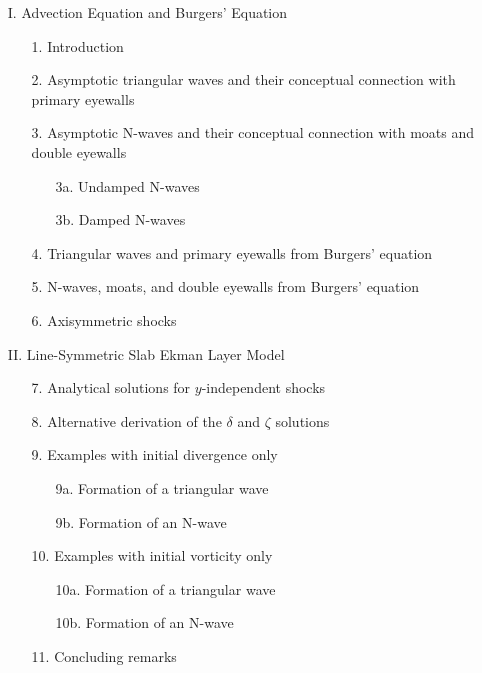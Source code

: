 \documentclass[10pt]{article}
\begin{document}
\addtolength{\leftmargini}{0.2in}
\setlength{\leftmarginii}{0.25in}
\begin{enumerate}
\setlength{\itemsep}{0pt}
\setlength{\parskip}{0pt}
\setlength{\parsep}{0pt}
\item[I.] Advection Equation and Burgers' Equation
\begin{enumerate}
\setlength{\itemsep}{0pt}
\setlength{\parskip}{0pt}
\setlength{\parsep}{0pt}
\item[1.] Introduction
\item[2.] Asymptotic triangular waves and their conceptual connection
      with primary eyewalls
\item[3.] Asymptotic N-waves and their conceptual connection with moats and double eyewalls
  \begin{enumerate}
     \item[3a.] Undamped N-waves
     \item[3b.] Damped N-waves
  \end{enumerate}
\item[4.] Triangular waves and primary eyewalls from Burgers' equation
\item[5.] N-waves, moats, and double eyewalls from Burgers' equation
\item[6.] Axisymmetric shocks
\end{enumerate}
\item[II.] Line-Symmetric Slab Ekman Layer Model
\begin{enumerate}
\setlength{\itemsep}{0pt}
\setlength{\parskip}{0pt}
\setlength{\parsep}{0pt}
\item[7.] Analytical solutions for $y$-independent shocks
\item[8.] Alternative derivation of the $\delta$ and $\zeta$ solutions
\item[9.] Examples with initial divergence only
  \begin{enumerate}
     \item[9a.] Formation of a triangular wave
     \item[9b.] Formation of an N-wave
  \end{enumerate}
\item[10.] Examples with initial vorticity only
  \begin{enumerate}
     \item[10a.] Formation of a triangular wave
     \item[10b.] Formation of an N-wave
  \end{enumerate}
\item[11.] Concluding remarks
\end{enumerate}
\end{enumerate}
\end{document}
